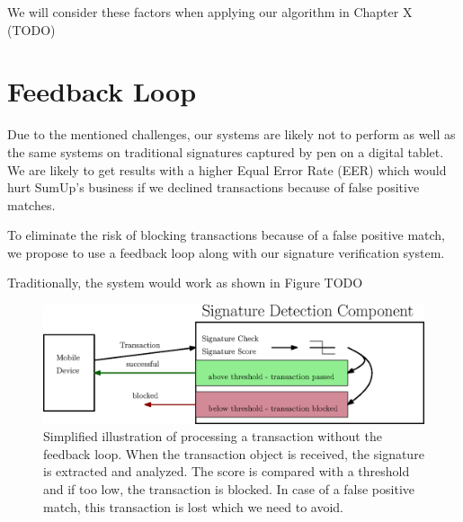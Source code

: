 \documentclass[a4paper, oneside]{csthesis}
\begin{document}
We will consider these factors when applying our algorithm in Chapter X (TODO)






\section{Feedback Loop}

Due to the mentioned challenges, our systems are likely not to perform as well as the same systems on traditional signatures captured by pen on a digital tablet. We are likely to get results with a higher Equal Error Rate (EER) which would hurt SumUp's business if we declined transactions because of false positive matches.

To eliminate the risk of blocking transactions because of a false positive match, we propose to use a feedback loop along with our signature verification system.

Traditionally, the system would work as shown in Figure TODO


\begin{figure}[tb]
    \begin{center}
        \includegraphics[width=1\textwidth]{figures/fb-loop1.eps}
    \end{center}
    \caption{Simplified illustration of processing a transaction without the feedback loop. When the transaction object is received, the signature is extracted and analyzed. The score is compared with a threshold and if too low, the transaction is blocked. In case of a false positive match, this transaction is lost which we need to avoid.}
    \label{fig:fb-loop1}
\end{figure}
\end{document}
